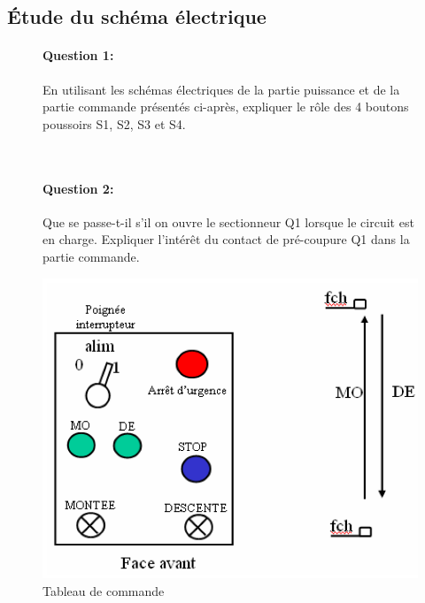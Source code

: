 \newpage

\subsection{Étude du schéma électrique}

\begin{figure}[htbp]
\begin{minipage}[c]{.65\linewidth}
\paragraph{Question 1:}

En utilisant les schémas électriques de la partie puissance et de la partie commande présentés ci-après, expliquer le rôle des 4 boutons poussoirs S1, S2, S3 et S4.

~~\\

\paragraph{Question 2:}

Que se passe-t-il s'il on ouvre le sectionneur Q1 lorsque le circuit est en charge. Expliquer l'intérêt du contact de pré-coupure Q1 dans la partie commande.

\end{minipage}
\hfill
\begin{minipage}[c]{.3\linewidth}
\begin{center}
\includegraphics[width=0.9\linewidth]{img/tableau.png}
\caption{Tableau de commande}
\label{fig:image13}
\end{center}
\end{minipage}
\end{figure}


